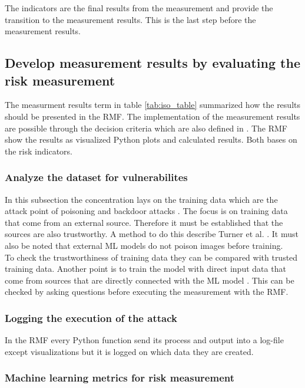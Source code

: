 The indicators are the final results from the measurement and provide the transition to the measurement results. This is the last step before the measurement results.

\subsection{Develop measurement results by evaluating the risk measurement}

The measurment results term in table \ref{tab:iso_table} summarized how the results should be presented in the RMF. The implementation of the measurement results are possible through the decision criteria which are also defined in \cite{ISO_27004_2009}. The RMF show the results as visualized Python plots and calculated results. Both bases on the risk indicators.

\subsubsection*{Analyze the dataset for vulnerabilites}

In this subsection the concentration lays on the training data which are the attack point of poisoning and backdoor attacks \cite{DBLP:conf/eusipco/ArshadAQLY21}. The focus is on training data that come from an external source. Therefore it must be established that the sources are also trustworthy. A method to do this describe Turner et al. \cite{turner2018clean}. It must also be noted that external ML models do not poison images before training. \\
To check the trustworthiness of training data they can be compared with trusted training data. Another point is to train the model with direct input data that come from sources that are directly connected with the ML model \cite{DBLP:conf/sp/XiaoLZX18}. This can be checked by asking questions before executing the measurement with the RMF.

\subsubsection*{Logging the execution of the attack}

In the RMF every Python function send its process and output into a log-file except visualizations but it is logged on which data they are created.

\subsubsection*{Machine learning metrics for risk measurement}

